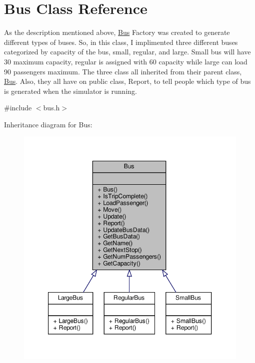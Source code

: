 \hypertarget{classBus}{}\section{Bus Class Reference}
\label{classBus}


As the description mentioned above, \hyperlink{classBus}{Bus} Factory was created to generate different types of buses. So, in this class, I implimented three different buses categorized by capacity of the bus, small, regular, and large. Small bus will have 30 maximum capacity, regular is assigned with 60 capacity while large can load 90 passengers maximum. The three class all inherited from their parent class, \hyperlink{classBus}{Bus}. Also, they all have on public class, Report, to tell people which type of bus is generated when the simulator is running.  




{\ttfamily \#include $<$bus.\+h$>$}



Inheritance diagram for Bus\+:\nopagebreak
\begin{figure}[H]
\begin{center}
\leavevmode
\includegraphics[width=347pt]{classBus__inherit__graph}
\end{center}
\end{figure}


